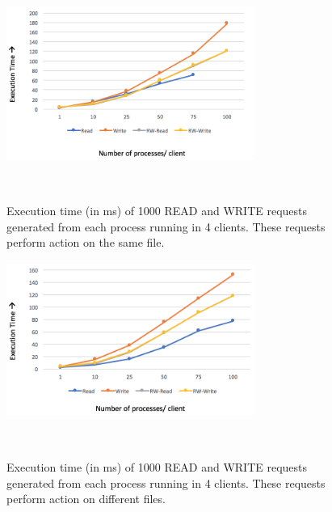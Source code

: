 \begin{figure}
\centering
\includegraphics[height=2in, width=3.2in]{images/F-VHC-SF.png}
\caption{Execution time (in ms) of 1000 READ and WRITE requests generated from each process running in 4 clients. These requests perform action on the same file.}~\label{fig:figure5}
\end{figure}




\begin{figure}
\centering
\includegraphics[height=2in, width=3.2in]{images/F-VHC-DF.png}
\caption{Execution time (in ms) of 1000 READ and WRITE requests generated from each process running in 4 clients. These requests perform action on different files.}~\label{fig:figure6}
\end{figure}










